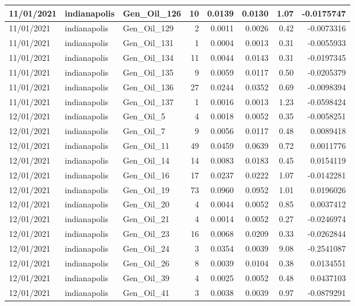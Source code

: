 \documentclass[
  letterpaper,
  DIV=11,
  numbers=noendperiod]{scrartcl}
\begin{document}
\begin{tabular}{l|l|l|r|r|r|r|r}
\hline
11/01/2021 & indianapolis & Gen\_Oil\_126 & 10 & 0.0139 & 0.0130 & 1.07 & -0.0175747\\
\hline
11/01/2021 & indianapolis & Gen\_Oil\_129 & 2 & 0.0011 & 0.0026 & 0.42 & -0.0073316\\
\hline
11/01/2021 & indianapolis & Gen\_Oil\_131 & 1 & 0.0004 & 0.0013 & 0.31 & -0.0055933\\
\hline
11/01/2021 & indianapolis & Gen\_Oil\_134 & 11 & 0.0044 & 0.0143 & 0.31 & -0.0197345\\
\hline
11/01/2021 & indianapolis & Gen\_Oil\_135 & 9 & 0.0059 & 0.0117 & 0.50 & -0.0205379\\
\hline
11/01/2021 & indianapolis & Gen\_Oil\_136 & 27 & 0.0244 & 0.0352 & 0.69 & -0.0098394\\
\hline
11/01/2021 & indianapolis & Gen\_Oil\_137 & 1 & 0.0016 & 0.0013 & 1.23 & -0.0598424\\
\hline
12/01/2021 & indianapolis & Gen\_Oil\_5 & 4 & 0.0018 & 0.0052 & 0.35 & -0.0058251\\
\hline
12/01/2021 & indianapolis & Gen\_Oil\_7 & 9 & 0.0056 & 0.0117 & 0.48 & 0.0089418\\
\hline
12/01/2021 & indianapolis & Gen\_Oil\_11 & 49 & 0.0459 & 0.0639 & 0.72 & 0.0011776\\
\hline
12/01/2021 & indianapolis & Gen\_Oil\_14 & 14 & 0.0083 & 0.0183 & 0.45 & 0.0154119\\
\hline
12/01/2021 & indianapolis & Gen\_Oil\_16 & 17 & 0.0237 & 0.0222 & 1.07 & -0.0142281\\
\hline
12/01/2021 & indianapolis & Gen\_Oil\_19 & 73 & 0.0960 & 0.0952 & 1.01 & 0.0196026\\
\hline
12/01/2021 & indianapolis & Gen\_Oil\_20 & 4 & 0.0044 & 0.0052 & 0.85 & 0.0037412\\
\hline
12/01/2021 & indianapolis & Gen\_Oil\_21 & 4 & 0.0014 & 0.0052 & 0.27 & -0.0246974\\
\hline
12/01/2021 & indianapolis & Gen\_Oil\_23 & 16 & 0.0068 & 0.0209 & 0.33 & -0.0262844\\
\hline
12/01/2021 & indianapolis & Gen\_Oil\_24 & 3 & 0.0354 & 0.0039 & 9.08 & -0.2541087\\
\hline
12/01/2021 & indianapolis & Gen\_Oil\_26 & 8 & 0.0039 & 0.0104 & 0.38 & 0.0134551\\
\hline
12/01/2021 & indianapolis & Gen\_Oil\_39 & 4 & 0.0025 & 0.0052 & 0.48 & 0.0437103\\
\hline
12/01/2021 & indianapolis & Gen\_Oil\_41 & 3 & 0.0038 & 0.0039 & 0.97 & -0.0879291\\

\end{tabular}
\end{document}

